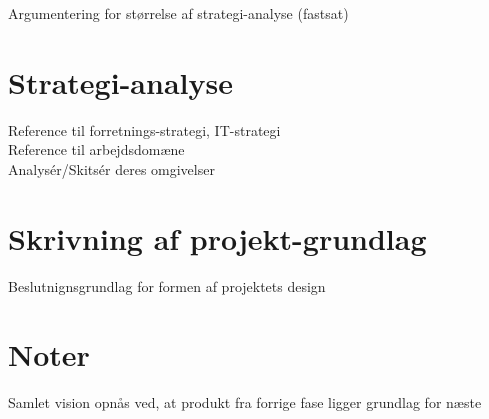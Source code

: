 \documentclass{article}
\begin{document}
Argumentering for størrelse af strategi-analyse (fastsat)
\\

\section{Strategi-analyse}

Reference til forretnings-strategi, IT-strategi
\\
Reference til arbejdsdomæne
\\
Analysér/Skitsér deres omgivelser

\section{Skrivning af projekt-grundlag}

Beslutnignsgrundlag for formen af projektets design

\section{Noter}

Samlet vision opnås ved, at produkt fra forrige fase ligger grundlag for næste
\end{document}
